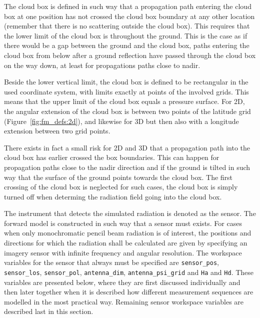 The cloud box is defined in such way that a propagation path 
entering the cloud box at one position has not crossed the cloud box
boundary at any other location (remember that there is no scattering
outside the cloud box). This requires that the lower limit of the
cloud box is throughout the ground. This is the case as if there would
be a gap between the ground and the cloud box, paths entering the
cloud box from below after a ground reflection have passed through the
cloud box on the way down, at least for propagations paths close to nadir.

Beside the lower vertical limit, the cloud box is defined to be
rectangular in the used coordinate system, with limits exactly at
points of the involved grids. This means that the upper limit of the
cloud box equals a pressure surface. For 2D, the angular extension of
the cloud box is between two points of the latitude grid
(Figure~\ref{fig:fm_defs:2d}), and likewise for 3D but then also with
a longitude extension between two grid points.

There exists in fact a small risk for 2D and 3D that a propagation
path into the cloud box has earlier crossed the box boundaries. This
can happen for propagation paths close to the nadir direction and if
the ground is tilted in such way that the surface of the ground points
towards the cloud box. The first crossing of the cloud box is
neglected for such cases, the cloud box is simply turned off when
determing the radiation field going into the cloud box.


\label{sec:fm_defs:sensor}

The instrument that detects the simulated radiation is denoted as the
sensor. The forward model is constructed in such
way that a sensor must exists. For cases when only monochromatic
pencil beam radiation is of interest, the positions and directions for
which the radiation shall be calculated are given by specifying an
imagery sensor with infinite frequency and angular resolution. The
workspace variables for the sensor that always must be specified are
\verb|sensor_pos|, \verb|sensor_los|, \verb|sensor_pol|, \verb|antenna_dim|,
\verb|antenna_psi_grid| and \verb|Ha| and \verb|Hd|. These variables
are presented below, where they are first discussed individually and
then later together when it is described how different measurement
sequences are modelled in the most practical way. Remaining sensor
workspace variables are described last in this section.


